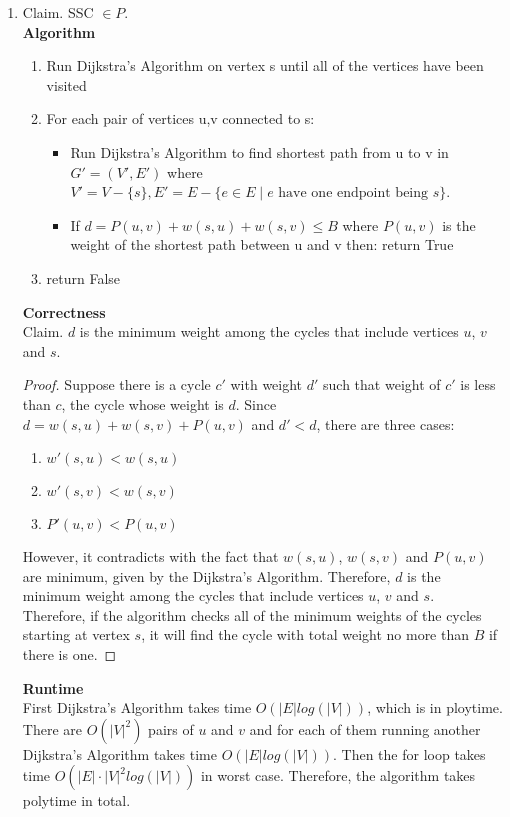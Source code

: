 \documentclass[11pt]{article}
\begin{document}
\begin{enumerate}
\begin{enumerate}
    \item Claim. SSC $\in P$.\\
    \textbf{Algorithm} 
    \begin{enumerate}
    \item Run Dijkstra's Algorithm on vertex s until all of the vertices have been visited
    \item For each pair of vertices u,v connected to s:
        \begin{itemize}
            \item Run Dijkstra's Algorithm to find shortest path from u to v in $G'=(V',E')$ where $V'=V-\{s\}, E'=E-\{e\in E\mid e \text{ have one endpoint being }s\}$.
            \item If $d = P(u,v) + w(s,u) + w(s,v) \leq B$ where $P(u,v)$ is the weight of the shortest path between u and v then: return True
        \end{itemize}
    \item return False
    \end{enumerate}
    \textbf{Correctness} \\
    Claim. $d$ is the minimum weight among the cycles that include vertices $u$, $v$ and $s$.
    \begin{proof}
    Suppose there is a cycle $c'$ with weight $d'$ such that weight of $c'$ is less than $c$, the cycle whose weight is $d$. Since $d = w(s,u) + w(s,v) + P(u,v)$ and $d' < d$, there are three cases:
    \begin{enumerate}
        \item $w'(s,u) < w(s,u)$
        \item $w'(s,v) < w(s,v)$
        \item $P'(u,v) < P(u,v)$
    \end{enumerate}
    However, it contradicts with the fact that $w(s,u)$, $w(s,v)$ and $P(u,v)$ are minimum, given by the Dijkstra's Algorithm. Therefore, $d$ is the minimum weight among the cycles that include vertices $u$, $v$ and $s$.\\
    Therefore, if the algorithm checks all of the minimum weights of the cycles starting at vertex $s$, it will find the cycle with total weight no more than $B$ if there is one.
    \end{proof}
    \textbf{Runtime} \\
    First Dijkstra's Algorithm takes time $O(|E|log(|V|))$, which is in ploytime. There are $O(|V|^2)$ pairs of $u$ and $v$ and for each of them running another Dijkstra's Algorithm takes time $O(|E|log(|V|))$. Then the for loop takes time $O(|E|\cdot |V|^2log(|V|))$ in worst case. Therefore, the algorithm takes polytime in total.
    

\end{enumerate}
\end{enumerate}
\end{document}
